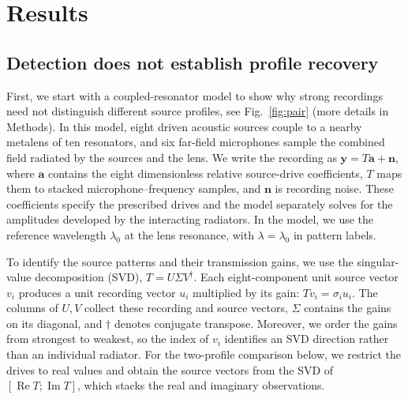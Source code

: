 \documentclass[lineno,pdflatex,sn-nature]{sn-jnl}%
\theoremstyle{thmstyleone}%
\theoremstyle{thmstyletwo}%
\theoremstyle{thmstylethree}%
\begin{document}
\section{Results}

\subsection{Detection does not establish profile recovery}
First, we start with a coupled-resonator model to show why strong recordings need not distinguish different source profiles, see Fig.~\ref{fig:pair} (more details in Methods). In this model, eight driven acoustic sources couple to a nearby metalens of ten resonators, and six far-field microphones sample the combined field radiated by the sources and the lens. We write the recording as $\mathbf y=T\mathbf a+\mathbf n$, where $\mathbf a$ contains the eight dimensionless relative source-drive coefficients, $T$ maps them to stacked microphone--frequency samples, and $\mathbf n$ is recording noise. These coefficients specify the prescribed drives and the model separately solves for the amplitudes developed by the interacting radiators. In the model, we use the reference wavelength $\lambda_0$ at the lens resonance, with $\lambda=\lambda_0$ in pattern labels.

To identify the source patterns and their transmission gains, we use the singular-value decomposition (SVD), $T=U\Sigma V^\dagger$. Each eight-component unit source vector $v_i$ produces a unit recording vector $u_i$ multiplied by its gain: $Tv_i=\sigma_i u_i$. The columns of $U,V$ collect these recording and source vectors, $\Sigma$ contains the gains on its diagonal, and $\dagger$ denotes conjugate transpose. Moreover, we order the gains from strongest to weakest, so the index of $v_i$ identifies an SVD direction rather than an individual radiator. For the two-profile comparison below, we restrict the drives to real values and obtain the source vectors from the SVD of $[\operatorname{Re}T;\operatorname{Im}T]$, which stacks the real and imaginary observations.
\end{document}
